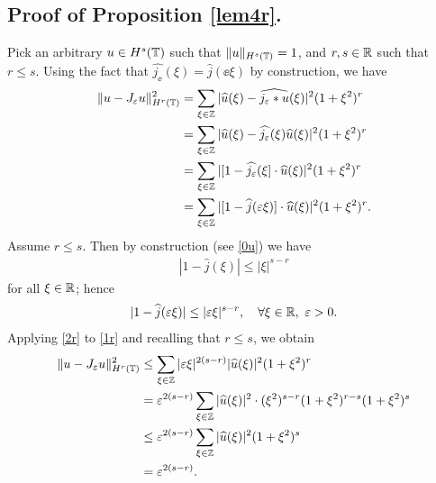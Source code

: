 \subsection{ Proof of Proposition \ref{lem4r}.}
Pick an arbitrary $u \in H^s(\mathbb{T})$ such that $\|u\|_{H^s(\mathbb{T})} = 1$, and $r, s \in \mathbb{R}$ such that $r \le s$. Using the fact that
$\widehat{j_\ee}(\xi) = \widehat{j}(\ee \xi)$ by construction, we have 
\begin{equation}
	\begin{split}
		\|u - J_\varepsilon u\|_{H^r(\mathbb{T})}^2 
		& = \sum_{\xi \in \mathbb{Z}} |\widehat{u}(\xi) - \widehat{j_\varepsilon * u}(\xi) |^2
		(1+\xi^2)^r
		\\
		& = \sum_{\xi \in \mathbb{Z}} |\widehat{u}(\xi) - \widehat{j_\varepsilon}(\xi)
		\widehat{u}(\xi) |^2 (1+\xi^2)^r
		\\
		& = \sum_{\xi \in \mathbb{Z}} | [1- \widehat{j_\varepsilon}(\xi] \cdot \widehat{u}(\xi) |^2
		(1+\xi^2)^r
		\\
		& = \sum_{\xi \in \mathbb{Z}} | [1- \widehat{j}(\varepsilon \xi)] \cdot \widehat{u}(\xi) |^2
		(1+\xi^2)^r.
		\label{1r}
	\end{split}
\end{equation}
Assume $r \le s$. Then by construction (see \ref{0u}) we have
\begin{equation*}
	\begin{split}
		|1 - \widehat{j } (\xi) | \le |\xi|^{s-r}
	\end{split}
\end{equation*}
for all $\xi \in \mathbb{R}$; hence
\begin{equation}
	\begin{split}
		|1 - \widehat{ j }(\varepsilon \xi)| \le |\varepsilon \xi |^{s-r}, \quad \forall
		\xi \in \mathbb{R}, \ \varepsilon > 0.
		\label{2r}
	\end{split}
\end{equation}
Applying \eqref{2r} to \eqref{1r} and recalling that $r \le s$, we obtain
\begin{equation}
	\label{2pr}
	\begin{split}
	\|u - J_\varepsilon u\|_{H^r(\mathbb{T})}^2 
	& \le \sum_{\xi \in \mathbb{Z}}  |\varepsilon \xi |^{2(s-r)}
	|\widehat{u}(\xi)|^2 (1 + \xi^2)^r
	\\
	& = \varepsilon^{2(s-r)} \sum_{\xi \in \mathbb{Z}} |\widehat{u}(\xi)|^2  \cdot (\xi^2)^{s-r}
	(1 + \xi^2)^{r-s} (1 + \xi^2)^{s}
	\\
	& \le \varepsilon^{2(s-r)}
	\sum_{\xi \in \mathbb{Z}} |\widehat{u}(\xi)|^2 (1 + \xi^2)^s
	\\
	& =  \varepsilon^{2(s-r)}.
	\end{split}
\end{equation}
